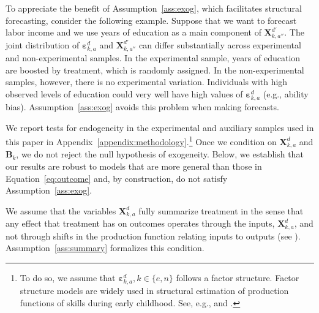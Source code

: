 To appreciate the benefit of Assumption~\ref{ass:exog}, which facilitates structural forecasting, consider the following example. Suppose that we want to forecast labor income and we use years of education as a main component of $\bm{X}_{k,{a''}}^{d'}$. The joint distribution of $\bm{\varepsilon}_{k,a}^d$ and $\bm{X}_{k,{a''}}^{d'}$ can differ substantially across experimental and non-experimental samples. In the experimental sample, years of education are boosted by treatment, which is randomly assigned. In the non-experimental samples, however, there is no experimental variation. Individuals with high observed levels of education could very well have high values of  $\bm{\varepsilon}_{k,a}^d$ (e.g., ability bias). Assumption~\ref{ass:exog} avoids this problem when making forecasts.

We report tests for endogeneity in the experimental and auxiliary samples used in this paper in Appendix~\ref{appendix:methodology}.\footnote{To do so, we assume that $\bm{\varepsilon}_{k,a}^d, k \in \{e,n\}$ follows a factor structure. Factor structure models are widely used in structural estimation of production functions of skills during early childhood. See, e.g., \citet{Cunha_Heckman_2008_JHR} and \citet{Cunha_Heckman_etal_2010_est_tech_cognoncog}.} Once we condition on $\bm{X}_{k,a}^d$ and $\bm{B}_{k}$, we do not reject the null hypothesis of exogeneity. Below, we establish that our results are robust to models that are more general than those in Equation~\eqref{eq:outcome} and, by construction, do not satisfy Assumption~\ref{ass:exog}.

We assume that the variables $\bm{X}_{k,a}^d$ fully summarize treatment in the sense that any effect that treatment has on outcomes operates through the inputs, $\bm{X}_{k,a}^d$, and not through shifts in the production function relating inputs to outputs (see \citealp{Heckman_Pinto_etal_2013_PerryFactor}). Assumption~\ref{ass:summary} formalizes this condition.

\onehalfspacing

